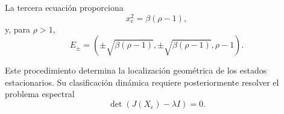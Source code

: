 \documentclass[12pt,a4paper,oneside]{report}
\numberwithin{equation}{chapter}
\begin{document}
La tercera ecuación proporciona
\begin{equation}
    x_e^2=\beta(\rho-1),
\end{equation}
y, para \(\rho>1\),
\begin{equation}
    E_\pm= \left( \pm\sqrt{\beta(\rho-1)}, \pm\sqrt{\beta(\rho-1)}, \rho-1 \right).
\end{equation}

Este procedimiento determina la localización geométrica de los estados estacionarios. Su clasificación dinámica requiere posteriormente resolver el problema espectral
\[
    \det\!\left(J(X_e)-\lambda I\right)=0.
\]
\end{document}
